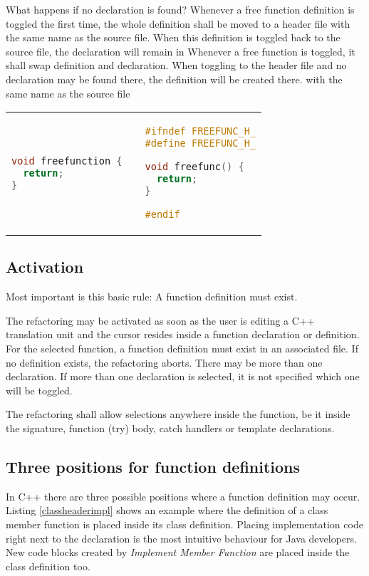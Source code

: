 What happens if no declaration is found? 
Whenever a free function definition is toggled the first time, the whole 
definition shall be moved to a header file with the same name as the source 
file. When this definition is toggled back to the source file, the declaration will remain in
Whenever a free function is toggled, it shall swap definition and declaration. 
When toggling to the header file and no declaration may be found there, the 
definition will be created there.
with the same name as the source file
\begin{tabular}{p{5cm}p{.4cm}p{5cm}}
\begin{lstlisting}[caption={A.h},label={01freefuncPostCpp},language=C++]
void freefunction {
  return;
}
\end{lstlisting}
& & 
\begin{lstlisting}[caption={A.cpp},label={01freefuncPostH},language=C++]
#ifndef FREEFUNC_H_
#define FREEFUNC_H_

void freefunc() {
  return;
}

#endif
\end{lstlisting}
\end{tabular}

\subsection{Activation}

Most important is this basic rule: A function definition must exist.

The refactoring may be activated as soon as the user is editing a C++ 
translation unit and the cursor resides inside a function declaration or 
definition. For the selected function, a function definition must exist in an 
associated file. If no definition exists, the refactoring aborts. There may be 
more than one declaration. If more than one declaration is selected, it is not 
specified which one will be toggled.

The refactoring shall allow selections anywhere inside the function, be it 
inside the signature, function (try) body, catch handlers or template 
declarations. 

\subsection{Three positions for function definitions}

\label{positions}
In C++ there are three possible positions where a 
function definition may occur. Listing \ref{classheaderimpl} shows an example
where the definition of a class member function is placed inside its class
definition. Placing implementation code right next to the declaration is the
most intuitive behaviour for Java developers. New code blocks created by
\textit{Implement Member Function} are placed inside the class definition too.


